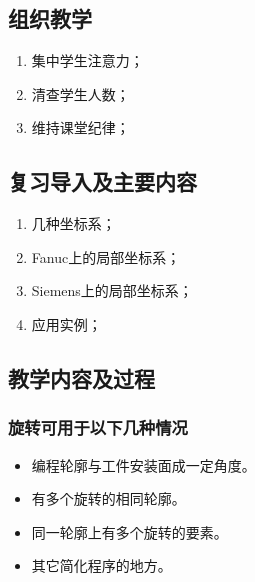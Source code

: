 \jxhj{%
	}

\makeshouye %

\subsection{组织教学}
\begin{enumerate}[\hspace{2em}1、]
	\item 集中学生注意力；
	\item 清查学生人数；
	\item 维持课堂纪律；
\end{enumerate}
\subsection{复习导入及主要内容}
\begin{enumerate}[\hspace{2em}1、]
\item 几种坐标系；
\item Fanuc上的局部坐标系；
\item Siemens上的局部坐标系；
\item 应用实例；
\end{enumerate}


\subsection{教学内容及过程}

\subsubsection{旋转可用于以下几种情况}
\begin{itemize}
\item 编程轮廓与工件安装面成一定角度。
\item 有多个旋转的相同轮廓。
\item 同一轮廓上有多个旋转的要素。
\item 其它简化程序的地方。
\end{itemize}

